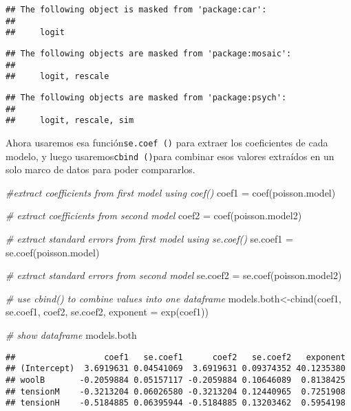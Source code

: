 \documentclass[
]{book}
\newenvironment{Shaded}{\begin{snugshade}}{\end{snugshade}}
\newcommand{\AttributeTok}[1]{\textcolor[rgb]{0.77,0.63,0.00}{#1}}
\newcommand{\CommentTok}[1]{\textcolor[rgb]{0.56,0.35,0.01}{\textit{#1}}}
\newcommand{\FunctionTok}[1]{\textcolor[rgb]{0.00,0.00,0.00}{#1}}
\newcommand{\NormalTok}[1]{#1}
\newcommand{\OtherTok}[1]{\textcolor[rgb]{0.56,0.35,0.01}{#1}}
\begin{document}
\begin{verbatim}
## The following object is masked from 'package:car':
## 
##     logit
\end{verbatim}

\begin{verbatim}
## The following objects are masked from 'package:mosaic':
## 
##     logit, rescale
\end{verbatim}

\begin{verbatim}
## The following objects are masked from 'package:psych':
## 
##     logit, rescale, sim
\end{verbatim}

Ahora usaremos esa función\texttt{se.coef\ ()} para extraer los coeficientes de cada modelo, y luego usaremos\texttt{cbind\ ()}para combinar esos valores extraídos en un solo marco de datos para poder compararlos.

\begin{Shaded}
\begin{Highlighting}[]
 \CommentTok{\#extract coefficients from first model using \textquotesingle{}coef()\textquotesingle{}}
\NormalTok{coef1 }\OtherTok{=} \FunctionTok{coef}\NormalTok{(poisson.model)}

\CommentTok{\# extract coefficients from second model}
\NormalTok{coef2 }\OtherTok{=} \FunctionTok{coef}\NormalTok{(poisson.model2)}

\CommentTok{\# extract standard errors from first model using \textquotesingle{}se.coef()\textquotesingle{}}
\NormalTok{se.coef1 }\OtherTok{=} \FunctionTok{se.coef}\NormalTok{(poisson.model)}

\CommentTok{\# extract standard errors from second model}
\NormalTok{se.coef2 }\OtherTok{=} \FunctionTok{se.coef}\NormalTok{(poisson.model2)}

\CommentTok{\# use \textquotesingle{}cbind()\textquotesingle{} to combine values into one dataframe}
\NormalTok{models.both}\OtherTok{\textless{}{-}}\FunctionTok{cbind}\NormalTok{(coef1, se.coef1, coef2, se.coef2, }\AttributeTok{exponent =} \FunctionTok{exp}\NormalTok{(coef1))}

\CommentTok{\# show dataframe}
\NormalTok{models.both}
\end{Highlighting}
\end{Shaded}

\begin{verbatim}
##                  coef1   se.coef1      coef2   se.coef2   exponent
## (Intercept)  3.6919631 0.04541069  3.6919631 0.09374352 40.1235380
## woolB       -0.2059884 0.05157117 -0.2059884 0.10646089  0.8138425
## tensionM    -0.3213204 0.06026580 -0.3213204 0.12440965  0.7251908
## tensionH    -0.5184885 0.06395944 -0.5184885 0.13203462  0.5954198
\end{verbatim}
\end{document}
